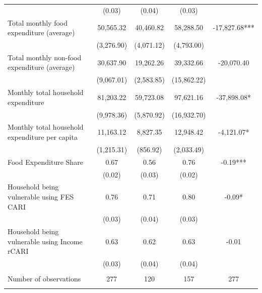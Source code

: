 \begin{tabular}{@{\extracolsep{5pt}}lcccc}
 & (0.03)  & (0.04)  & (0.03)  &  \\ [1ex]
Total monthly food expenditure (average)   & 50,565.32    & 40,460.82    & 58,288.50    & -17,827.68***   \\
 & (3,276.90)  & (4,071.12)  & (4,793.00)  &  \\ [1ex]
Total monthly non-food expenditure (average)   & 30,637.90    & 19,262.26    & 39,332.66    & -20,070.40   \\
 & (9,067.01)  & (2,583.85)  & (15,862.22)  &  \\ [1ex]
Monthly total household expenditure   & 81,203.22    & 59,723.08    & 97,621.16    & -37,898.08*   \\
 & (9,978.36)  & (5,870.92)  & (16,932.70)  &  \\ [1ex]
Monthly total household expenditure per capita   & 11,163.12    & 8,827.35    & 12,948.42    & -4,121.07*   \\
 & (1,215.31)  & (856.92)  & (2,033.49)  &  \\ [1ex]
Food Expenditure Share   & 0.67    & 0.56    & 0.76    & -0.19***   \\
 & (0.02)  & (0.03)  & (0.02)  &  \\ [1ex]
Household being vulnerable using FES CARI   & 0.76    & 0.71    & 0.80    & -0.09*   \\
 & (0.03)  & (0.04)  & (0.03)  &  \\ [1ex]
Household being vulnerable using Income rCARI   & 0.63    & 0.62    & 0.63    & -0.01   \\
 & (0.03)  & (0.04)  & (0.04)  &  \\ [1ex]
\hline \\[-1.8ex]
Number of observations  & 277   & 120   & 157  & 277  \\
\hline \hline \\[-1.8ex]

\end{tabular}
